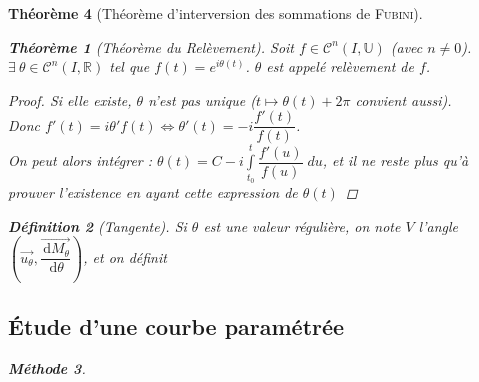 \documentclass[11pt,a4paper]{report}
\newtheorem{theorem}{Théorème}[chapter]
\newtheorem{itheorem}[theorem]{Théorème}
\theoremstyle{definition}
\newtheorem{dfn}[theorem]{Définition}
\newtheorem{methode}[theorem]{Méthode}
\begin{document}
\begin{theorem}[Théorème d'interversion des sommations de \textsc{Fubini}]
{{%
\begin{itheorem}[Théorème du Relèvement]
Soit $f \in \mathcal{C}^n\left( I,\mathbb{U} \right)$ (avec $n \neq 0$). \\
$\exists \: \theta \in \mathcal{C}^n\left( I,\ensuremath{\mathbb{R}} \right)$ tel que $f(t) = e^{i\theta{}(t)}$. $\theta$ est appelé \emph{relèvement} de $f$.
\end{itheorem}

\begin{proof}
Si elle existe, $\theta$ n'est pas unique ($t \mapsto \theta(t) + 2\pi$ convient aussi).\\
Donc $f'(t) = i\theta{}' f(t) \Leftrightarrow \theta{}'(t)=-i\dfrac{f'(t)}{f(t)}$. \\
On peut alors intégrer : $\theta (t) = C - i \int \limits_{t_0}^t \dfrac{f'(u)}{f(u)}\; du$, et il ne reste plus qu'à prouver l'existence en ayant cette expression de $\theta{}(t)$
\end{proof}

\begin{dfn}[Tangente]
Si $\theta$ est une valeur régulière, on note $V$ l'angle $\left( \overrightarrow{u_{\theta}},\dfrac{\overrightarrow{\,\mathrm{d} M_\theta}}{\,\mathrm{d}\theta}  \right)$, et on définit 
\end{dfn}
\subsection{Étude d'une courbe paramétrée} %
\label{sub:etude_courbe_parametree}
\begin{methode}

\end{methode}}}
\end{theorem}
\end{document}
